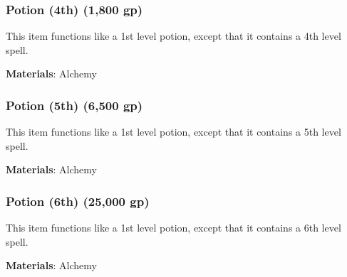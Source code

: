 \lowercase{\hypertarget{item:Potion (4th)}{}}\label{item:Potion (4th)}
\hypertarget{item:Potion (4th)}{\subsubsection{Potion (4th)\hfill{} (1,800 gp)}}

This item functions like a 1st level potion, except that it contains a 4th level spell.



\vspace{0.25em}
\textbf{Materials}: Alchemy


\lowercase{\hypertarget{item:Potion (5th)}{}}\label{item:Potion (5th)}
\hypertarget{item:Potion (5th)}{\subsubsection{Potion (5th)\hfill{} (6,500 gp)}}

This item functions like a 1st level potion, except that it contains a 5th level spell.



\vspace{0.25em}
\textbf{Materials}: Alchemy


\lowercase{\hypertarget{item:Potion (6th)}{}}\label{item:Potion (6th)}
\hypertarget{item:Potion (6th)}{\subsubsection{Potion (6th)\hfill{} (25,000 gp)}}

This item functions like a 1st level potion, except that it contains a 6th level spell.



\vspace{0.25em}
\textbf{Materials}: Alchemy
